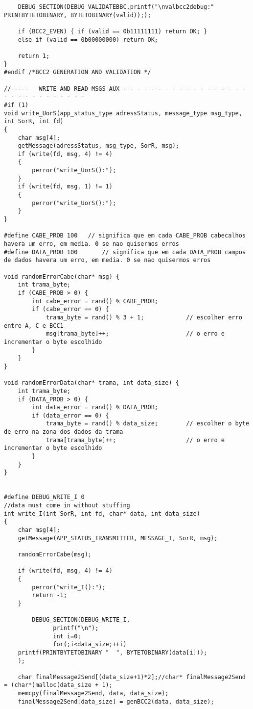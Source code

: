 \begin{lstlisting}
	DEBUG_SECTION(DEBUG_VALIDATEBBC,printf("\nvalbcc2debug:" PRINTBYTETOBINARY, BYTETOBINARY(valid)););
	
	if (BCC2_EVEN) { if (valid == 0b11111111) return OK; }
	else if (valid == 0b00000000) return OK;

	return 1;
}
#endif /*BCC2 GENERATION AND VALIDATION */

//-----   WRITE AND READ MSGS AUX - - - - - - - - - - - - - - - - - - - - - - - - - - - - - -
#if (1)
void write_UorS(app_status_type adressStatus, message_type msg_type, int SorR, int fd)
{
	char msg[4];
	getMessage(adressStatus, msg_type, SorR, msg);
	if (write(fd, msg, 4) != 4)
	{
		perror("write_UorS():");
	}
	if (write(fd, msg, 1) != 1)
	{
		perror("write_UorS():");
	}
}

#define CABE_PROB 100	// significa que em cada CABE_PROB cabecalhos havera um erro, em media. 0 se nao quisermos erros
#define DATA_PROB 100		// significa que em cada DATA_PROB campos de dados havera um erro, em media. 0 se nao quisermos erros

void randomErrorCabe(char* msg) {	
	int trama_byte;
	if (CABE_PROB > 0) {
		int cabe_error = rand() % CABE_PROB;
		if (cabe_error == 0) {
			trama_byte = rand() % 3 + 1;			// escolher erro entre A, C e BCC1
			msg[trama_byte]++;						// o erro e incrementar o byte escolhido
		}
	}
}

void randomErrorData(char* trama, int data_size) {	
	int trama_byte;
	if (DATA_PROB > 0) {
		int data_error = rand() % DATA_PROB;
		if (data_error == 0) {
			trama_byte = rand() % data_size;		// escolher o byte de erro na zona dos dados da trama
			trama[trama_byte]++;					// o erro e incrementar o byte escolhido
		}
	}
}


#define DEBUG_WRITE_I 0
//data must come in without stuffing
int write_I(int SorR, int fd, char* data, int data_size)
{
	char msg[4];
	getMessage(APP_STATUS_TRANSMITTER, MESSAGE_I, SorR, msg);
	
	randomErrorCabe(msg);
	
	if (write(fd, msg, 4) != 4)
	{
		perror("write_I():");
		return -1;
	}

		DEBUG_SECTION(DEBUG_WRITE_I,
		      printf("\n");
		      int i=0;
		      for(;i<data_size;++i)
	printf(PRINTBYTETOBINARY "  ", BYTETOBINARY(data[i]));
	);
	
	char finalMessage2Send[(data_size+1)*2];//char* finalMessage2Send = (char*)malloc(data_size + 1);
	memcpy(finalMessage2Send, data, data_size);
	finalMessage2Send[data_size] = genBCC2(data, data_size);


\end{lstlisting}
